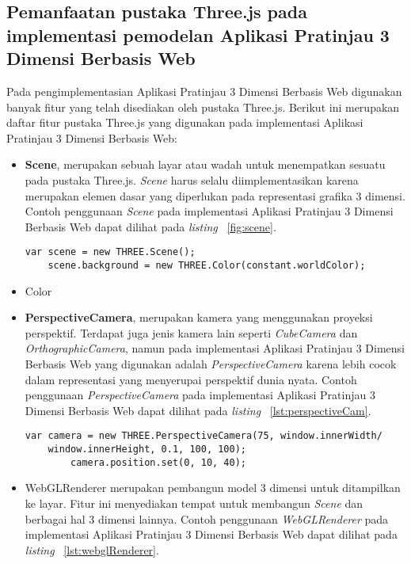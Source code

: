 \subsection{Pemanfaatan pustaka Three.js pada implementasi pemodelan Aplikasi Pratinjau 3 Dimensi Berbasis Web}
\label{sec:pemanfaatanthreejs}
Pada pengimplementasian Aplikasi Pratinjau 3 Dimensi Berbasis Web digunakan banyak fitur yang telah disediakan oleh pustaka Three.js. Berikut ini merupakan daftar fitur pustaka Three.js yang digunakan pada implementasi Aplikasi Pratinjau 3 Dimensi Berbasis Web:
\begin{itemize}
	\item {\bf Scene}, merupakan sebuah layar atau wadah untuk menempatkan sesuatu pada pustaka Three.js. {\it Scene} harus selalu diimplementasikan karena merupakan elemen dasar yang diperlukan pada representasi grafika 3 dimensi. Contoh penggunaan {\it Scene} pada implementasi Aplikasi Pratinjau 3 Dimensi Berbasis Web dapat dilihat pada {\it listing} ~\ref{fig:scene}.
\begin{lstlisting}[caption={Contoh penggunaan {\it Scene} pada implementasi Aplikasi Pratinjau 3 Dimensi Berbasis Web dengan latar warna putih}, label={fig:scene},captionpos=b]
	var scene = new THREE.Scene();
	scene.background = new THREE.Color(constant.worldColor);
\end{lstlisting}
	\item Color
	\item {\bf PerspectiveCamera}, merupakan kamera yang menggunakan proyeksi perspektif. Terdapat juga jenis kamera lain seperti {\it CubeCamera} dan {\it OrthographicCamera}, namun pada implementasi Aplikasi Pratinjau 3 Dimensi Berbasis Web yang digunakan adalah {\it PerspectiveCamera} karena lebih cocok dalam representasi yang menyerupai perspektif dunia nyata. Contoh penggunaan {\it PerspectiveCamera} pada implementasi Aplikasi Pratinjau 3 Dimensi Berbasis Web dapat dilihat pada {\it listing} ~\ref{lst:perspectiveCam}.
\begin{lstlisting}[caption={Contoh penggunaan {\it PerspectiveCamera} pada implementasi Aplikasi Pratinjau 3 Dimensi Berbasis Web dengan pengaturan kamera dan posisi tertentu}, label={lst:perspectiveCam},captionpos=b]
	var camera = new THREE.PerspectiveCamera(75, window.innerWidth/
	window.innerHeight, 0.1, 100, 100);
    	camera.position.set(0, 10, 40);
\end{lstlisting}
	\item WebGLRenderer merupakan pembangun model 3 dimensi untuk ditampilkan ke layar. Fitur ini menyediakan tempat untuk membangun {\it Scene} dan berbagai hal 3 dimensi lainnya. Contoh penggunaan {\it WebGLRenderer} pada implementasi Aplikasi Pratinjau 3 Dimensi Berbasis Web dapat dilihat pada {\it listing} ~\ref{lst:webglRenderer}.

\end{itemize}
